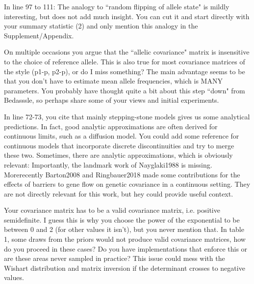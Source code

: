 \begin{point}{}
    In line 97 to 111: The analogy to ``random flipping of allele state" is mildly interesting, 
but does not add much insight. 
You can cut it and start directly with your summary statistic (2) and only mention this analogy in the Supplement/Appendix.
\end{point}


\begin{point}{}
    On multiple occasions you argue that the ``allelic covariance" matrix is
    insensitive to the choice of reference allele.  This is also true for most
    covariance matrices of the style (p1-p, p2-p), or do I miss something?
    The main advantage seems to be that you don't have to estimate mean allele
    frequencies, which is MANY parameters.  You probably have thought quite a
    bit about this step ``down" from Bedasssle, so perhaps share some of your
    views and initial experiments.
\end{point}


\begin{point}{}
    In line 72-73, you cite that mainly stepping-stone models gives us some analytical predictions. 
In fact, good analytic approximations are often derived for continuous limits, such as a diffusion model.
You could add some reference for continuous models that incorporate discrete discontinuities and try to merge these two. 
Sometimes, there are analytic approximations, which is obviously relevant: 
Importantly, the landmark work of Nayglaki1988 is missing. 
Morerecently Barton2008 and Ringbauer2018 made some contributions 
for the effects of barriers to gene flow on genetic covariance in a continuous setting. 
They are not directly relevant for this work, but hey could provide useful context.
\end{point}


\begin{point}{}
    Your covariance matrix has to be a valid covariance matrix, i.e. positive semidefinite. 
I guess this is why you choose the power of the exponential to be between 0 and 2 
(for other values it isn't), but you never mention that. 
In table 1, some draws from the priors would not produce valid covariance matrices, 
how do you proceed in these cases? 
Do you have implementations that enforce this or are these areas never sampled in practice? 
This issue could mess with the Wishart distribution and matrix inversion if the determinant crosses to negative values.
\end{point}

